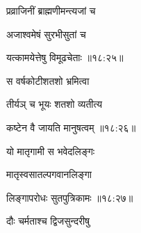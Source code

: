 \ujvers{}

\nemslokab

{\devanagarifontbold प्रव्राजिनीं ब्राह्मणीमन्त्यजां च  \danda\dontdisplaylinenum  }%

\nemslokac

{\devanagarifontbold अजाश्वमेषं सुरभीसुतां च }%
  \dontdisplaylinenum    {}%


\nemslokad

{\devanagarifontbold यत्कामयेत्तेषु विमूढचेताः {॥१८:२५॥} \veg\dontdisplaylinenum }%

\ujvers{}

\nemslokab

{\devanagarifontbold स वर्षकोटीशतशो भ्रमित्वा  \danda\dontdisplaylinenum }%
 
\nemslokac

{\devanagarifontbold तीर्यञ् च भूयः शतशो व्यतीत्य }%
  \dontdisplaylinenum

\nemslokad

{\devanagarifontbold कष्टेन वै जायति मानुषत्वम् {॥१८:२६॥} \veg\dontdisplaylinenum }%
 
\ujvers{}

\nemslokab

{\devanagarifontbold यो मातृगामी स भवेदलिङ्गः  \danda\dontdisplaylinenum }%
 
\nemslokac

{\devanagarifontbold मातृस्वसातल्पगवानलिङ्गा }%
  \dontdisplaylinenum    {}%


\nemslokad

{\devanagarifontbold लिङ्गापरोधः सुतपुत्रिकामः {॥१८:२७॥} \veg\dontdisplaylinenum }%

\ujvers{}

\nemslokab

{\devanagarifontbold दौः चर्मताश्च द्विजसुन्दरीषु  \danda\dontdisplaylinenum }%
  
